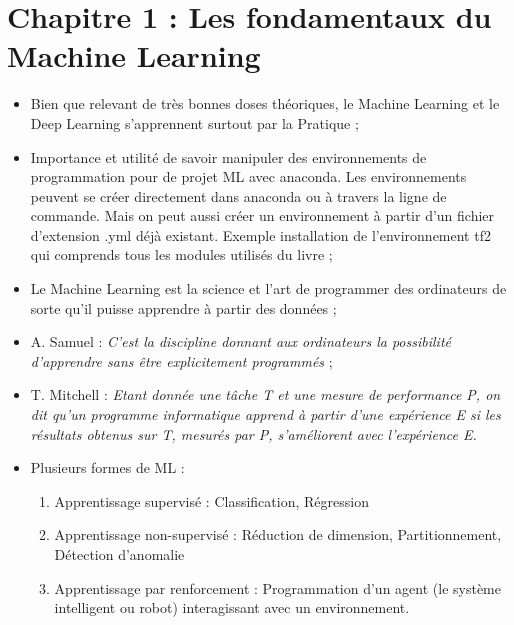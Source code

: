 \documentclass[executivepaper]{article}
\begin{document}
\section{Chapitre 1 : Les fondamentaux du Machine Learning}

\begin{itemize}
\item Bien que relevant de très bonnes doses théoriques, le Machine Learning et le Deep Learning s'apprennent surtout par la Pratique ;\\
\item Importance et utilité de savoir manipuler des environnements de programmation pour de projet ML avec anaconda. Les environnements peuvent se créer directement dans anaconda ou à travers la ligne de commande. Mais on peut aussi créer un environnement à partir d'un fichier d'extension .yml déjà existant. Exemple installation de l'environnement tf2 qui comprends tous les modules utilisés du livre ;\\
\item Le Machine Learning est la science et l'art de programmer des ordinateurs de sorte qu'il puisse apprendre à partir des données ;\\
\item A. Samuel : \textit{C'est la discipline donnant aux ordinateurs la possibilité d'apprendre sans être explicitement programmés} ;\\
\item T. Mitchell : \textit{Etant donnée une tâche T et une mesure de performance P, on dit qu'un programme informatique apprend à partir d'une expérience E si les résultats obtenus sur  T, mesurés par P, s'améliorent avec l'expérience E.}\\
\item Plusieurs formes de ML : 
\begin{enumerate}
\item Apprentissage supervisé : Classification, Régression
\item Apprentissage non-supervisé : Réduction de dimension, Partitionnement, Détection d'anomalie
\item Apprentissage par renforcement : Programmation d'un agent (le système intelligent ou robot) interagissant avec un environnement.\\


\end{enumerate}
\end{itemize}
\end{document}
